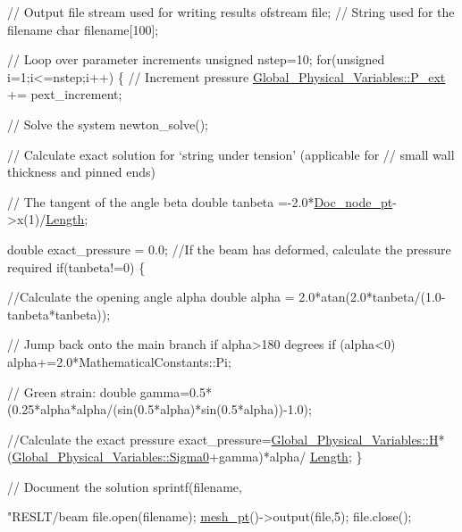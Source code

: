 \begin{DoxyCodeInclude}
 \textcolor{comment}{// Output file stream used for writing results}
 ofstream file;
 \textcolor{comment}{// String used for the filename}
 \textcolor{keywordtype}{char} filename[100]; 

 \textcolor{comment}{// Loop over parameter increments}
 \textcolor{keywordtype}{unsigned} nstep=10;
 \textcolor{keywordflow}{for}(\textcolor{keywordtype}{unsigned} i=1;i<=nstep;i++)
  \{
   \textcolor{comment}{// Increment pressure}
   \hyperlink{namespaceGlobal__Physical__Variables_a0406c0cbd463d1df2458fe5de98a00eb}{Global\_Physical\_Variables::P\_ext} += pext\_increment;
   
   \textcolor{comment}{// Solve the system}
   newton\_solve();
    
   \textcolor{comment}{// Calculate exact solution for `string under tension' (applicable for}
   \textcolor{comment}{// small wall thickness and pinned ends)}

   \textcolor{comment}{// The tangent of the angle beta}
   \textcolor{keywordtype}{double} tanbeta =-2.0*\hyperlink{classElasticBeamProblem_a9c96cab7e71243e51f7c4040a84cdd5d}{Doc\_node\_pt}->x(1)/\hyperlink{classElasticBeamProblem_aa68b1c77e0aa1571fe956d62bd8cf096}{Length};

   \textcolor{keywordtype}{double} exact\_pressure = 0.0;
   \textcolor{comment}{//If the beam has deformed, calculate the pressure required}
   \textcolor{keywordflow}{if}(tanbeta!=0)
    \{
      
      \textcolor{comment}{//Calculate the opening angle alpha}
      \textcolor{keywordtype}{double} alpha = 2.0*atan(2.0*tanbeta/(1.0-tanbeta*tanbeta));

      \textcolor{comment}{// Jump back onto the main branch if alpha>180 degrees}
      \textcolor{keywordflow}{if} (alpha<0) alpha+=2.0*MathematicalConstants::Pi;

     \textcolor{comment}{// Green strain:}
     \textcolor{keywordtype}{double} gamma=0.5*(0.25*alpha*alpha/(sin(0.5*alpha)*sin(0.5*alpha))-1.0);

     \textcolor{comment}{//Calculate the exact pressure}
     exact\_pressure=\hyperlink{namespaceGlobal__Physical__Variables_af6e07423e22c0991084d9a2f43727805}{Global\_Physical\_Variables::H}*
      (\hyperlink{namespaceGlobal__Physical__Variables_a417dc688a70c4f06ef0faed047068ba2}{Global\_Physical\_Variables::Sigma0}+gamma)*alpha/
      \hyperlink{classElasticBeamProblem_aa68b1c77e0aa1571fe956d62bd8cf096}{Length};
    \} 
   
   \textcolor{comment}{// Document the solution}
   sprintf(filename,\textcolor{stringliteral}{"RESLT/beam%
   file.open(filename);
   \hyperlink{classElasticBeamProblem_ae7d14ba8bec2325a82cbeed0c1b29910}{mesh\_pt}()->output(file,5);
   file.close();
   
}
\end{DoxyCodeInclude}
